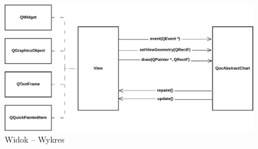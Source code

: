 \begin{figure}
\centering
\caption{Widok -- Wykres}\label{rys:widok:wykres}
\includegraphics[scale=0.75]{img/widok-wykres.pdf}
\end{figure}




